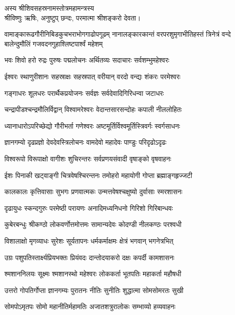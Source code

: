 अस्य श्रीशिवसहस्रनामस्तोत्रमहामन्त्रस्य \textsf{}\\
श्रीविष्णुः ऋषिः, अनुष्टुप् छन्दः, परमात्मा श्रीशङ्करो देवता।


{वामाङ्कारूढगौरीनिबिडकुचभराभोगगाढोपगूढम्}
{नानालङ्कारकान्तं वरपरशुमृगाभीतिहस्तं त्रिनेत्रं}
{वन्दे बालेन्दुमौलिं गजवदनगुहाश्लिष्टपार्श्वं महेशम्}

\twolineshloka
{भवः शिवो हरो रुद्रः पुरुषः पद्मलोचनः}
{अर्थितव्यः सदाचारः सर्वशम्भुमहेश्वरः}

\twolineshloka
{ईश्वरः स्थाणुरीशानः सहस्राक्षः सहस्रपात्}
{वरीयान् वरदो वन्द्यः शंकरः परमेश्वरः}

\twolineshloka
{गङ्गाधरः शूलधरः परार्थैकप्रयोजनः}
{सर्वज्ञः सर्वदेवादिगिरिधन्वा जटाधरः}

\twolineshloka
{चन्द्रापीडश्चन्द्रमौलिर्विद्वान् विश्वामरेश्वरः}
{वेदान्तसारसन्दोहः कपाली नीललोहितः}

\twolineshloka
{ध्यानाधारोऽपरिच्छेद्यो गौरीभर्ता गणेश्वरः}
{अष्टमूर्तिर्विश्वमूर्तिस्त्रिवर्गः स्वर्गसाधनः}

\twolineshloka
{ज्ञानगम्यो दृढप्रज्ञो देवदेवस्त्रिलोचनः}
{वामदेवो महादेवः पाण्डुः परिदृढोऽदृढः}

\twolineshloka
{विश्वरूपो विरूपाक्षो वागीशः शुचिरन्तरः}
{सर्वप्रणयसंवादी वृषाङ्को वृषवाहनः}

\twolineshloka
{ईशः पिनाकी खट्वाङ्गी चित्रवेषश्चिरन्तनः}
{तमोहरो महायोगी गोप्ता ब्रह्माङ्गहृज्जटी}

\twolineshloka
{कालकालः कृत्तिवासाः सुभगः प्रणवात्मकः}
{उन्मत्तवेषश्चक्षुष्यो दुर्वासाः स्मरशासनः}

\twolineshloka
{दृढायुधः स्कन्दगुरुः परमेष्ठी परायणः}
{अनादिमध्यनिधनो गिरिशो गिरिबान्धवः}

\twolineshloka
{कुबेरबन्धुः श्रीकण्ठो लोकवर्णोत्तमोत्तमः}
{सामान्यदेवः कोदण्डी नीलकण्ठः परश्वधी}

\twolineshloka
{विशालाक्षो मृगव्याधः सुरेशः सूर्यतापनः}
{धर्मकर्माक्षमः क्षेत्रं भगवान् भगनेत्रभित्}

\twolineshloka
{उग्रः पशुपतिस्तार्क्ष्यप्रियभक्तः प्रियंवदः}
{दान्तोदयाकरो दक्षः कपर्दी कामशासनः}

\twolineshloka
{श्मशाननिलयः सूक्ष्मः श्मशानस्थो महेश्वरः}
{लोककर्ता भूतपतिः महाकर्ता महौषधी}

\twolineshloka
{उत्तरो गोपतिर्गोप्ता ज्ञानगम्यः पुरातनः}
{नीतिः सुनीतिः शुद्धात्मा सोमसोमरतः सुखी}

\twolineshloka
{सोमपोऽमृतपः सोमो महानीतिर्महामतिः}
{अजातशत्रुरालोकः सम्भाव्यो हव्यवाहनः}

